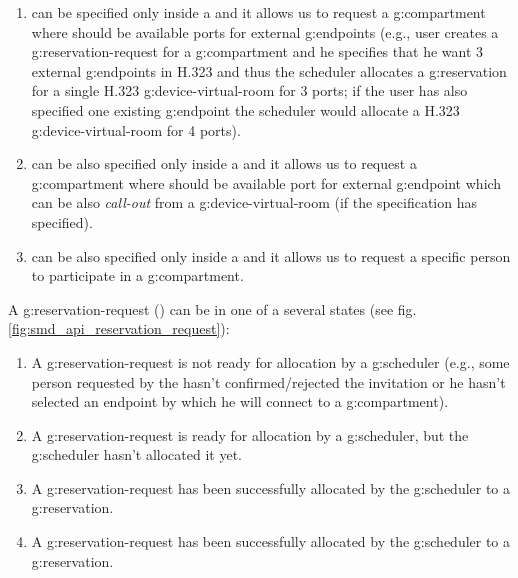 \begin{enumerate}
\item {} can be specified only inside a  and it allows us to request a \gls{g:compartment} where should be available ports for external \glspl{g:endpoint} (e.g., user creates a \gls{g:reservation-request} for a \gls{g:compartment} and he specifies that he want 3 external \glspl{g:endpoint} in H.323 and thus the scheduler allocates a \gls{g:reservation} for a single H.323 \gls{g:device-virtual-room} for 3 ports; if the user has also specified one existing \gls{g:endpoint} the scheduler would allocate a H.323 \gls{g:device-virtual-room} for 4 ports).

\item {} can be also specified only inside a  and it allows us to request a \gls{g:compartment} where should be available port for external \gls{g:endpoint} which can be also \emph{call-out} from a \gls{g:device-virtual-room} (if the specification has  specified).

\item {} can be also specified only inside a  and it allows us to request a specific person to participate in a \gls{g:compartment}.

\end{enumerate}

A \gls{g:reservation-request} () can be in one of a several states (see fig. \ref{fig:smd_api_reservation_request}):
\begin{enumerate}
\item {} A \gls{g:reservation-request} is not ready for allocation by a \gls{g:scheduler} (e.g., some person requested by the  hasn't confirmed/rejected the invitation or he hasn't selected an endpoint by which he will connect to a \gls{g:compartment}).
\item {} A \gls{g:reservation-request} is ready for allocation by a \gls{g:scheduler}, but the \gls{g:scheduler} hasn't allocated it yet.
\item {} A \gls{g:reservation-request} has been successfully allocated by the \gls{g:scheduler} to a \gls{g:reservation}.
\item {} A \gls{g:reservation-request} has been successfully allocated by the \gls{g:scheduler} to a \gls{g:reservation}.
\end{enumerate}

